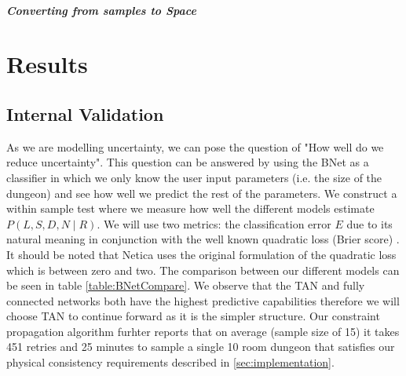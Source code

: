 \documentclass{UoYCSproject}
\begin{document}
\paragraph{Converting from samples to Space}

\chapter{Results}
\label{cha:results}
\section{Internal Validation}
As we are modelling uncertainty, we can pose the question of "How well do we reduce uncertainty". This question can be answered by using the BNet as a classifier in which we only know the user input parameters (i.e. the size of the dungeon) and see how well we predict the rest of the parameters. We construct a within sample test where we measure how well the different models estimate \(P(L,S,D,N\mid R)\). We will use two metrics: the classification error \(E\) due to its natural meaning in conjunction with the well known quadratic loss (Brier score) \parencite{PearlScoringRules}. It should be noted that Netica uses the original formulation of the quadratic loss which is between zero and two. The comparison between our different models can be seen in table \ref{table:BNetCompare}. We observe that the TAN and fully connected networks both have the highest predictive capabilities therefore we will choose TAN to continue forward as it is the simpler structure. Our constraint propagation algorithm furhter reports that on average (sample size of 15) it takes 451 retries and 25 minutes to sample a single 10 room dungeon that satisfies our physical consistency requirements described in \ref{sec:implementation}.
\end{document}
